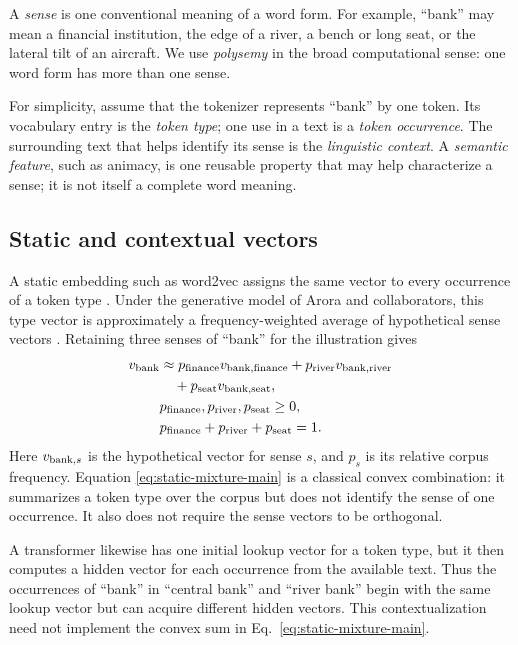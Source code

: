 \documentclass[
  aps,
  reprint,
  superscriptaddress,
  floatfix,
  nofootinbib,
  longbibliography
]{revtex4-2}
\begin{document}
A \emph{sense} is one conventional meaning of a word form.  For example,
``bank'' may mean a financial institution, the edge of a river, a bench or
long seat, or the lateral tilt of an aircraft.  We use \emph{polysemy} in the
broad computational sense: one word form has more than one sense.

For simplicity, assume that the tokenizer represents ``bank'' by one token.
Its vocabulary entry is the \emph{token type}; one use in a text is a
\emph{token occurrence}.  The surrounding text that helps identify its sense
is the \emph{linguistic context}.  A \emph{semantic feature}, such as animacy,
is one reusable property that may help characterize a sense; it is not itself
a complete word meaning.

\subsection{Static and contextual vectors}

A static embedding such as word2vec assigns the same vector to every
occurrence of a token type \cite{mikolov2013}.  Under the generative model of
Arora and collaborators, this type vector is approximately a
frequency-weighted average of hypothetical sense vectors
\cite{arora-etal-2018-linear}.  Retaining three senses of ``bank'' for the
illustration gives
\begin{equation}
\begin{aligned}
 v_{\rm bank}
 &\approx p_{\rm finance}v_{{\rm bank},{\rm finance}}
 +p_{\rm river}v_{{\rm bank},{\rm river}}\\
 &\quad+p_{\rm seat}v_{{\rm bank},{\rm seat}},\\
 &p_{\rm finance},p_{\rm river},p_{\rm seat}\geq 0,\\
 &p_{\rm finance}+p_{\rm river}+p_{\rm seat}=1 .
\end{aligned}
 \label{eq:static-mixture-main}
\end{equation}
Here $v_{{\rm bank},s}$ is the hypothetical vector for sense $s$, and $p_s$
is its relative corpus frequency.  Equation
\eqref{eq:static-mixture-main} is a classical convex combination: it
summarizes a token type over the corpus but does not identify the sense of one
occurrence.  It also does not require the sense vectors to be orthogonal.

A transformer likewise has one initial lookup vector for a token type, but it
then computes a hidden vector for each occurrence from the available text.
Thus the occurrences of ``bank'' in ``central bank'' and ``river bank'' begin
with the same lookup vector but can acquire different hidden vectors.  This
contextualization need not implement the convex sum in
Eq.~\eqref{eq:static-mixture-main}.
\end{document}

